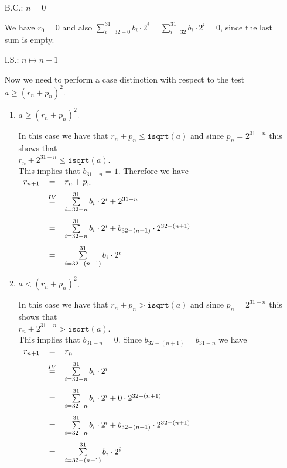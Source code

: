 \begin{enumerate}
\item[B.C.:] $n = 0$

  We have $r_0 = 0$ and also $\sum\limits_{i=32-0}^{31} b_i \cdot 2^i = \sum\limits_{i=32}^{31} b_i \cdot 2^i =  0$,
  since the last sum is empty.
\item[I.S.:] $n \mapsto n+1$

  Now we need to perform a case distinction with respect to the test $a \geq (r_n + p_n)^2$.
  \begin{enumerate}
  \item $a \geq (r_n + p_n)^2$.

    In this case we have that $r_n + p_n \leq \mathtt{isqrt}(a)$ and since $p_n = 2^{31-n}$ this shows that
    \\[0.2cm]
    \hspace*{1.3cm}
    $r_n + 2^{31-n} \leq \mathtt{isqrt}(a)$.
    \\[0.2cm]
    This implies that $b_{31-n} = 1$.  Therefore we have
    \\[0.2cm]
    \hspace*{1.3cm}
    $
    \begin{array}[t]{lcl}
      r_{n+1} & = & r_n + p_n \\[0.2cm] 
              & \stackrel{IV}{=} & \sum\limits_{i=32-n}^{31} b_i \cdot 2^i + 2^{31-n} \\[0.5cm]
              & = & \sum\limits_{i=32-n}^{31} b_i \cdot 2^i + b_{32-(n+1)} \cdot 2^{32-(n+1)} \\[0.5cm]
              & = & \sum\limits_{i=32-(n+1)}^{31} b_i \cdot 2^i 
    \end{array}
    $
  \item $a < (r_n + p_n)^2$. 

    In this case we have that $r_n + p_n > \mathtt{isqrt}(a)$ and since $p_n = 2^{31-n}$ this shows that
    \\[0.2cm]
    \hspace*{1.3cm}
    $r_n + 2^{31-n} > \mathtt{isqrt}(a)$.
    \\[0.2cm]
    This implies that $b_{31-n} = 0$.  Since $b_{32-(n+1)} = b_{31-n}$ we have
    \\[0.2cm]
    \hspace*{1.3cm}
    $
    \begin{array}[t]{lcl}
      r_{n+1} & = & r_n  \\[0.2cm] 
              & \stackrel{IV}{=} & \sum\limits_{i=32-n}^{31} b_i \cdot 2^i \\[0.5cm]
              & = & \sum\limits_{i=32-n}^{31} b_i \cdot 2^i + 0 \cdot 2^{32-(n+1)} \\[0.5cm]
              & = & \sum\limits_{i=32-n}^{31} b_i \cdot 2^i + b_{32-(n+1)} \cdot 2^{32-(n+1)} \\[0.5cm]
              & = & \sum\limits_{i=32-(n+1)}^{31} b_i \cdot 2^i 
    \end{array}
    $
  \end{enumerate}
\end{enumerate}
